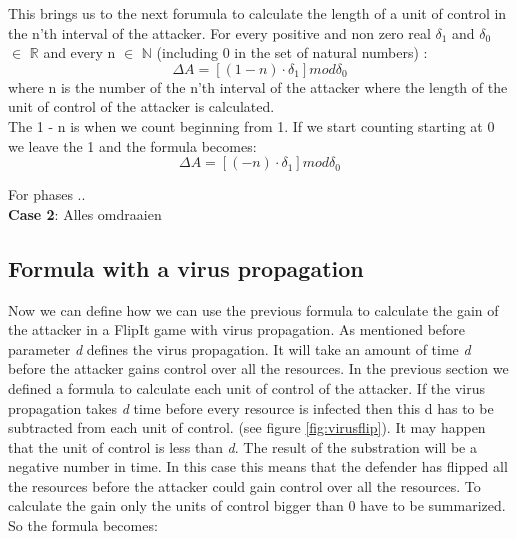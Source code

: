 This brings us to the next forumula to calculate the length of a unit of control in the n'th interval of the attacker. 
For every positive and non zero real $\delta_{1}$ and $\delta_{0}$ $\in$ \(\mathbb{R}\) and every n $\in$ \(\mathbb{N}\) (including 0 in the set of natural numbers) :
\begin{equation}\label{first}
\Delta A = [( 1- n  ) \cdot \delta_{1}] mod \delta_{0}
\end{equation}
where n is the number of the n'th interval of the attacker where the length of the unit of control of the attacker is calculated.\\

The 1 - n is when we count beginning from 1. If we start counting starting at 0 we leave the 1 and the formula becomes:
\begin{equation}\label{first}
\Delta A = [( - n  ) \cdot \delta_{1}] mod \delta_{0}
\end{equation}


For phases .. \\

\textbf{Case 2}:
Alles omdraaien 



\subsection{Formula with a virus propagation}
Now we can define how we can use the previous formula to calculate the gain of the attacker in a FlipIt game with virus propagation.
As mentioned before parameter \textit{d} defines the virus propagation. It will take an amount of time \textit{d} before the attacker gains control over all the resources. In the previous section we defined a formula to calculate each unit of control of the attacker. If the virus propagation takes \textit{d} time before every resource is infected then this d has to be subtracted from each unit of control. (see figure \ref{fig:virusflip}). It may happen that the unit of control is less than \textit{d}. The result of the substration will be a negative number in time. In this case this means that the defender has flipped all the resources before the attacker could gain control over all the resources. To calculate the gain only the units of control bigger than 0 have to be summarized. So the formula becomes:

